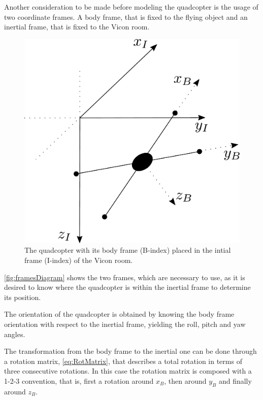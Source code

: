 Another consideration to be made before modeling the quadcopter is the usage of two coordinate frames. A body frame, that is fixed to the flying object and an inertial frame, that is fixed to the Vicon room. 
%
\begin{figure}[H]
    \centering
    \includegraphics[scale=0.25]{figures/framesDiagram}
    \caption{The quadcopter with its body frame (B-index) placed in the intial frame (I-index) of the Vicon room. }
    \label{fig:framesDiagram}
\end{figure}

\autoref{fig:framesDiagram} shows the two frames, which are necessary to use, as it is desired to know where the quadcopter is within the inertial frame to determine its position. 

The orientation of the quadcopter is obtained by knowing the body frame orientation with respect to the inertial frame, yielding the roll, pitch and yaw angles. 

The transformation from the body frame to the inertial one can be done through a rotation matrix, \autoref{eq:RotMatrix}, that describes a total rotation in terms of three consecutive rotations. In this case the rotation matrix is composed with a 1-2-3 convention, that is, first a rotation around $x_B$, then around $y_B$ and finally around $z_B$.

